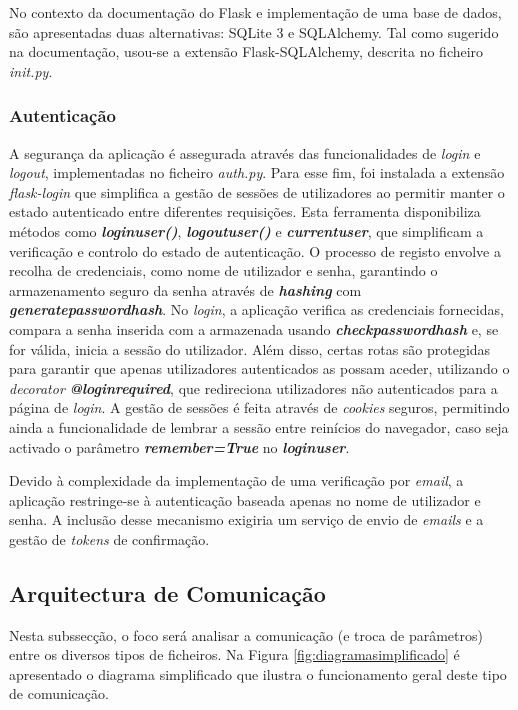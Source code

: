No contexto da documentação do Flask e implementação de uma base de dados, são apresentadas duas alternativas: SQLite 3 e SQLAlchemy. Tal como sugerido na documentação, usou-se a extensão Flask-SQLAlchemy, descrita no ficheiro \textit{\textunderscore\textunderscore init.py\textunderscore\textunderscore}.

\subsubsection{Autenticação}
A segurança da aplicação é assegurada através das funcionalidades de \textit{login} e \textit{logout}, implementadas no ficheiro \textit{auth.py}. Para esse fim, foi instalada a extensão \textit{flask-login} que simplifica a gestão de sessões de utilizadores ao permitir manter o estado autenticado entre diferentes requisições. Esta ferramenta disponibiliza métodos como \textbf{\textit{login\textunderscore user()}}, \textbf{\textit{logout\textunderscore user()}} e \textbf{\textit{current\textunderscore user}}, que simplificam a verificação e controlo do estado de autenticação. O processo de registo envolve a recolha de credenciais, como nome de utilizador e senha, garantindo o armazenamento seguro da senha através de \textbf{\textit{hashing}} com \textbf{\textit{generate\textunderscore password\textunderscore hash}}. No \textit{login}, a aplicação verifica as credenciais fornecidas, compara a senha inserida com a armazenada usando \textbf{\textit{check\textunderscore password\textunderscore hash}} e, se for válida, inicia a sessão do utilizador. Além disso, certas rotas são protegidas para garantir que apenas utilizadores autenticados as possam aceder, utilizando o \textit{decorator} \textbf{\textit{@login\textunderscore required}}, que redireciona utilizadores não autenticados para a página de \textit{login}. A gestão de sessões é feita através de \textit{cookies} seguros, permitindo ainda a funcionalidade de lembrar a sessão entre reinícios do navegador, caso seja activado o parâmetro \textbf{\textit{remember=True}} no \textbf{\textit{login\textunderscore user}}. 

Devido à complexidade da implementação de uma verificação por \textit{email}, a aplicação restringe-se à autenticação baseada apenas no nome de utilizador e senha. A inclusão desse mecanismo exigiria um serviço de envio de \textit{emails} e a gestão de \textit{tokens} de confirmação.

\subsection{Arquitectura de Comunicação}
\label{sec:comunicacao}
Nesta subssecção, o foco será analisar a comunicação (e troca de parâmetros) entre os diversos tipos de ficheiros. Na Figura \ref{fig:diagramasimplificado} é apresentado o diagrama simplificado que ilustra o funcionamento geral deste tipo de comunicação. 

